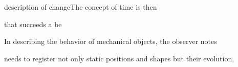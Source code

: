 description of changeThe concept of time is then  


 that succeeds a be   


In describing the behavior of mechanical objects, the observer notes 

needs to register not only static positions and shapes but their evolution,  






